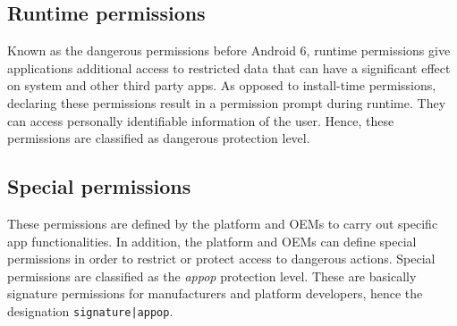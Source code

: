 \documentclass[
  a4paper,  %
  twoside,  %
  bibliography=totoc,
  headsepline,
  cleardoublepage=empty,
  parskip=half,
  draft=false,
  open=any
]{scrbook}
\begin{document}
\subsection{Runtime permissions}
Known as the dangerous permissions before Android 6, runtime permissions give applications additional access to restricted data that can have a significant effect on system and other third party apps. As opposed to install-time permissions, declaring these permissions result in a permission prompt during runtime. They can access personally identifiable information of the user. Hence, these permissions are classified as dangerous protection level.

\subsection{Special permissions}
These permissions are defined by the platform and OEMs to carry out specific app functionalities. In addition, the platform and OEMs can define special permissions in order to restrict or protect access to dangerous actions. Special permissions are classified as the \textit{appop} protection level. These are basically signature permissions for manufacturers and platform developers, hence the designation \texttt{signature|appop}.
\end{document}
